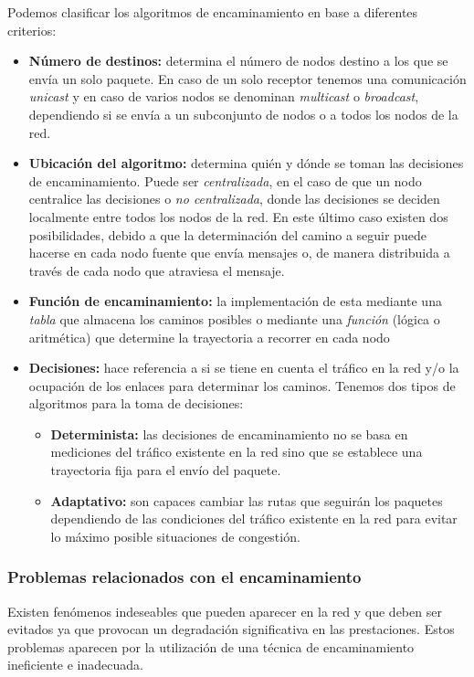 Podemos clasificar los algoritmos de encaminamiento en base a diferentes criterios:
\begin{itemize}
	\item \textbf{Número de destinos:} determina el número de nodos destino a los que se envía un solo paquete. En caso de un solo receptor tenemos una comunicación \textit{unicast} y en caso de varios nodos se denominan \textit{multicast} o \textit{broadcast}, dependiendo si se envía a un subconjunto de nodos o a todos los nodos de la red.
	\item \textbf{Ubicación del algoritmo:} determina quién y dónde se toman las decisiones de encaminamiento. Puede ser \textit{centralizada}, en el caso de que un nodo centralice las decisiones o \textit{no centralizada}, donde las decisiones se deciden localmente entre todos los nodos de la red. En este último caso existen dos posibilidades, debido a que la determinación del camino a seguir puede hacerse en cada nodo fuente que envía mensajes o, de manera distribuida a través de cada nodo que atraviesa el mensaje.
	\item \textbf{Función de encaminamiento:} la implementación de esta mediante una \textit{tabla} que almacena los caminos posibles o mediante una \textit{función} (lógica o aritmética) que determine la trayectoria a recorrer en cada nodo
	\item \textbf{Decisiones:} hace referencia a si se tiene en cuenta el tráfico en la red y/o la ocupación de los enlaces para determinar los caminos. Tenemos dos tipos de algoritmos para la toma de decisiones:
		\begin{itemize}
			\item \textbf{Determinista:} las decisiones de encaminamiento no se basa en mediciones del tráfico existente en la red sino que se establece una trayectoria fija para el envío del paquete.
			\item \textbf{Adaptativo:} son capaces cambiar las rutas que seguirán los paquetes dependiendo de las condiciones del tráfico existente en la red para evitar lo máximo posible situaciones de congestión.
		\end{itemize}
\end{itemize}

\subsubsection{Problemas relacionados con el encaminamiento}
Existen fenómenos indeseables que pueden aparecer en la red y que deben ser evitados ya que provocan un degradación significativa en las prestaciones. Estos problemas aparecen por la utilización de una técnica de encaminamiento ineficiente e inadecuada.

